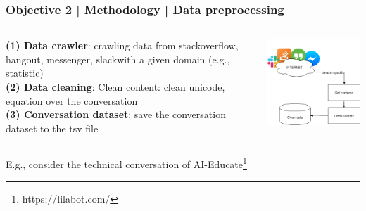 \documentclass{beamer}
\begin{document}
\begin{frame}
\frametitle{Objective 2 | Methodology | Data preprocessing}



\begin{columns}
	
	\begin{column}{.55\textwidth}
\textbf{	(1) Data crawler}: crawling data from stackoverflow,\\ hangout, messenger, slackwith a given domain (e.g., statistic)\\
\textbf{	(2) Data cleaning}: Clean content: clean unicode, equation over the conversation\\
\textbf{	(3) Conversation dataset}: save the conversation dataset to the tsv file\\
	\end{column}
	\begin{column}{.55\textwidth}
		\includegraphics[width=50mm]{dts.png}
	\end{column}
	

\end{columns}
\begin{flushleft}
	E.g., consider the technical conversation of AI-Educate\footnote{https://lilabot.com/}
\end{flushleft}

\end{frame}
\end{document}
